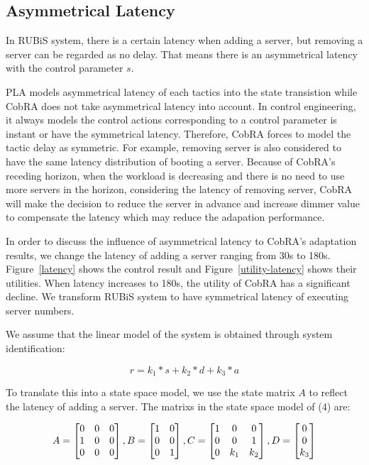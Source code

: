 \documentclass[sigconf]{acmart}
\begin{document}
	\subsection{Asymmetrical Latency}
	In RUBiS system, there is a certain latency when adding a server, but removing a server can be regarded as no delay. That means there is an asymmetrical latency with the control parameter $s$.
	
	PLA models asymmetrical latency of each tactics into the state transistion while CobRA does not take asymmetrical latency into account. In control engineering, it always models the control actions corresponding to a control parameter is instant or have the symmetrical latency. Therefore, CobRA forces to model the tactic delay as symmetric. For example, removing server is also considered to have the same latency distribution of booting a server. Because of CobRA's receding horizon, when the workload is decreasing and there is no need to use more servers in the horizon, considering the latency of removing server, CobRA will make the decision to reduce the server in advance and increase dimmer value to compensate the latency which may reduce the adapation performance.
	
	In order to discuss the influence of asymmetrical latency to CobRA's adaptation results, we change the latency of adding a server ranging from 30s to 180s. Figure~\ref{latency} shows the control result and Figure~\ref{utility-latency} shows their utilities. When latency increases to 180s, the utility of CobRA has a significant decline. We transform RUBiS system to have symmetrical latency of executing server numbers. 
	
	We assume that the linear model of the system is obtained through system identification: 
	
	\begin{equation}
	r=k_1 *s+k_2 *d+k_3*a
	\end{equation}
	
	To translate this into a state space model, we use the state matrix $A$ to reflect the latency of adding a server. The matrixs in the state space model of (4) are:
	
	\begin{equation}
	A=
	\begin{bmatrix}
	0&0&0\\
	1&0&0\\
	0&0&0
	\end{bmatrix},
	B=
	\begin{bmatrix}
	1&0\\
	0&0\\
	0&1
	\end{bmatrix},\\
	C=
	\begin{bmatrix}
	1&0&0\\
	0&0&1\\
	0&k_1&k_2
	\end{bmatrix},
	D=
	\begin{bmatrix}
	0\\
	0\\
	k_3
	\end{bmatrix}
	\end{equation}
	
\end{document}

